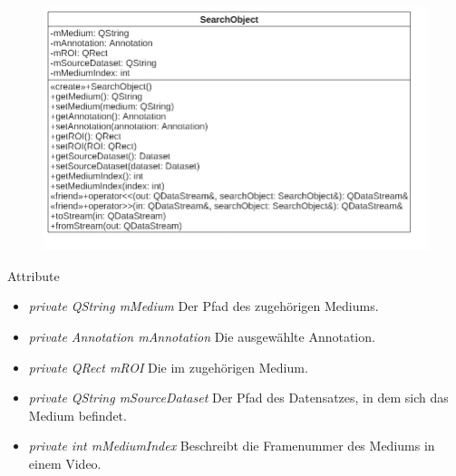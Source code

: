 \begin{figure}[H]
\centering
\includegraphics[scale=0.5]{img/Klassendiagramm/Klassen/Model/SearchObject}
\label{fig:searchObject}
\end{figure}

Attribute
\begin{itemize}
\item\textit{private QString mMedium} Der Pfad des zugehörigen Mediums.
\item\textit{private Annotation mAnnotation} Die ausgewählte \gls{Annotation}.
\item\textit{private QRect mROI} Die  im zugehörigen Medium.
\item\textit{private QString mSourceDataset} Der Pfad des Datensatzes, in dem sich das Medium befindet.
\item\textit{private int mMediumIndex} Beschreibt die Framenummer des Mediums in einem Video.
\end{itemize}


